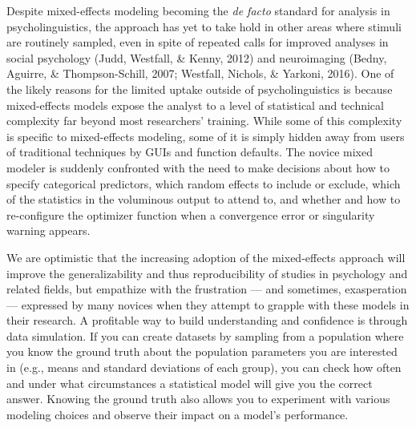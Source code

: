 \documentclass[
  english,
  doc,floatsintext]{apa6}
\begin{document}
Despite mixed-effects modeling becoming the \emph{de facto} standard for analysis in psycholinguistics, the approach has yet to take hold in other areas where stimuli are routinely sampled, even in spite of repeated calls for improved analyses in social psychology (Judd, Westfall, \& Kenny, 2012) and neuroimaging (Bedny, Aguirre, \& Thompson-Schill, 2007; Westfall, Nichols, \& Yarkoni, 2016). One of the likely reasons for the limited uptake outside of psycholinguistics is because mixed-effects models expose the analyst to a level of statistical and technical complexity far beyond most researchers' training. While some of this complexity is specific to mixed-effects modeling, some of it is simply hidden away from users of traditional techniques by GUIs and function defaults. The novice mixed modeler is suddenly confronted with the need to make decisions about how to specify categorical predictors, which random effects to include or exclude, which of the statistics in the voluminous output to attend to, and whether and how to re-configure the optimizer function when a convergence error or singularity warning appears.

We are optimistic that the increasing adoption of the mixed-effects approach will improve the generalizability and thus reproducibility of studies in psychology and related fields, but empathize with the frustration --- and sometimes, exasperation --- expressed by many novices when they attempt to grapple with these models in their research. A profitable way to build understanding and confidence is through data simulation. If you can create datasets by sampling from a population where you know the ground truth about the population parameters you are interested in (e.g., means and standard deviations of each group), you can check how often and under what circumstances a statistical model will give you the correct answer. Knowing the ground truth also allows you to experiment with various modeling choices and observe their impact on a model's performance.
\end{document}
